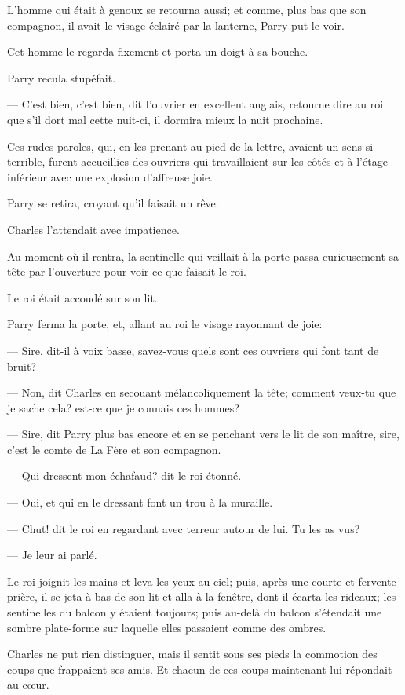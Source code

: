 L'homme qui était à genoux se retourna aussi; et comme, plus bas que son compagnon, il avait le visage éclairé par la lanterne, Parry put le voir.

Cet homme le regarda fixement et porta un doigt à sa bouche.

Parry recula stupéfait.

— C'est bien, c'est bien, dit l'ouvrier en excellent anglais, retourne dire au roi que s'il dort mal cette nuit-ci, il dormira mieux la nuit prochaine.

Ces rudes paroles, qui, en les prenant au pied de la lettre, avaient un sens si terrible, furent accueillies des ouvriers qui travaillaient sur les côtés et à l'étage inférieur avec une explosion d'affreuse joie.

Parry se retira, croyant qu'il faisait un rêve.

Charles l'attendait avec impatience.

Au moment où il rentra, la sentinelle qui veillait à la porte passa curieusement sa tête par l'ouverture pour voir ce que faisait le roi.

Le roi était accoudé sur son lit.

Parry ferma la porte, et, allant au roi le visage rayonnant de joie:

— Sire, dit-il à voix basse, savez-vous quels sont ces ouvriers qui font tant de bruit?

— Non, dit Charles en secouant mélancoliquement la tête; comment veux-tu que je sache cela? est-ce que je connais ces hommes?

— Sire, dit Parry plus bas encore et en se penchant vers le lit de son maître, sire, c'est le comte de La Fère et son compagnon.

— Qui dressent mon échafaud? dit le roi étonné.

— Oui, et qui en le dressant font un trou à la muraille.

— Chut! dit le roi en regardant avec terreur autour de lui. Tu les as vus?

— Je leur ai parlé.

Le roi joignit les mains et leva les yeux au ciel; puis, après une courte et fervente prière, il se jeta à bas de son lit et alla à la fenêtre, dont il écarta les rideaux; les sentinelles du balcon y étaient toujours; puis au-delà du balcon s'étendait une sombre plate-forme sur laquelle elles passaient comme des ombres.

Charles ne put rien distinguer, mais il sentit sous ses pieds la commotion des coups que frappaient ses amis. Et chacun de ces coups maintenant lui répondait au cœur.

